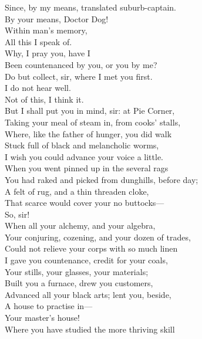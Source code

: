 \documentclass[a4paper,oneside,12pt]{memoir}
\begin{document}
\begin{drama*}
\subtlespeaks Since, by my means, translated suburb-captain.\\
\facespeaks By your means, Doctor Dog!\\
\subtlespeaks {} Within man's memory,\\
All this I speak of.\\
\facespeaks {} Why, I pray you, have I\\
Been countenanced by you, or you by me?\\
Do but collect, sir, where I met you first.\\
\subtlespeaks I do not hear well.\\
\facespeaks {} Not of this, I think it.\\
But I shall put you in mind, sir: at Pie Corner,\\
Taking your meal of steam in, from cooks' stalls,\\
Where, like the father of hunger, you did walk\\
Stuck full of black and melancholic worms,\\
\subtlespeaks I wish you could advance your voice a little.\\
\facespeaks When you went pinned up in the several rags\\
You had raked and picked from dunghills, before day;\\
A felt of rug, and a thin threaden cloke,\\
That scarce would cover your no buttocks---\\
\subtlespeaks {} So, sir!\\
\facespeaks When all your alchemy, and your algebra,\\
Your conjuring, cozening, and your dozen of trades,\\
Could not relieve your corps with so much linen\\
I gave you countenance, credit for your coals,\\
Your stills, your glasses, your materials;\\
Built you a furnace, drew you customers,\\
Advanced all your black arts; lent you, beside,\\
A house to practise in---\\
\subtlespeaks {} Your master's house!\\
\facespeaks Where you have studied the more thriving skill\\

\end{drama*}
\end{document}
